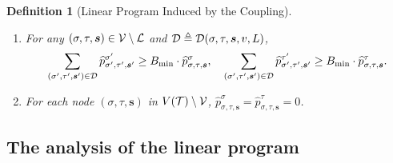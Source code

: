 \documentclass[11pt]{article}
\newtheorem{definition}[theorem]{Definition}
\newcommand{\seqS}{\boldsymbol{s}}
\begin{document}
\begin{definition}[Linear Program Induced by the Coupling]
\begin{enumerate}
\begin{align}
            \end{align}\label{item-forth-LP}
        \item For any $(\sigma,\tau, \seqS)\in \+V\setminus \+L$ and $\+D \triangleq \+D(\sigma,\tau, \seqS,v,L)$,
           \begin{align}\label{eqn-hat-error-bound}
               \sum_{(\sigma',\tau',\seqS')\in \+D}\widehat{p}^{\sigma'}_{\sigma',\tau', \seqS'} \geq  B_{\min} \cdot \widehat{p}^{\sigma}_{\sigma,\tau, \seqS}, \quad \sum_{(\sigma',\tau',\seqS')\in \+D}\widehat{p}^{\tau'}_{\sigma',\tau',\seqS'}\geq  B_{\min} \cdot \widehat{p}^{\tau}_{\sigma,\tau,\seqS}.
           \end{align}\label{item-fifth-LP}
        \item  For each node $(\sigma, \tau, \seqS)$ in $V(\mathcal{T})\setminus \mathcal{V}$, $ \widehat{p}^{\sigma}_{\sigma,\tau, \seqS}= \widehat{p}^{\tau}_{\sigma,\tau, \seqS}=0$. \label{item-sixth-LP}
    \end{enumerate}
\end{definition}


\subsection{The analysis of the linear program}
\end{document}
